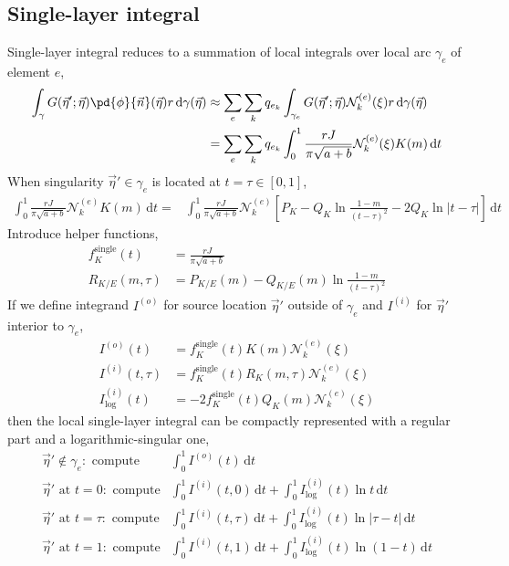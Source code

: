 \documentclass{jfm}
\begin{document}
\subsection{Single-layer integral}
Single-layer integral reduces to a summation of local integrals over local arc $\gamma_e$ of element $e$,
\begin{align}
\nonumber\int_{\gamma}G(\vec{\eta}';\vec{\eta})
\pd{\phi}{\vec{n}}(\vec{\eta}) r \,\mathrm{d}\gamma(\vec{\eta})
&\approx\sum_e \sum_k q_{e_k}
\int_{\gamma_e}G(\vec{\eta}';\vec{\eta})\mathcal{N}^{(e)}_k(\xi) r \,\mathrm{d}\gamma(\vec{\eta})\\
&=\sum_e \sum_k q_{e_k}
\int_0^1\frac{ r J }{\pi \sqrt{a+b}}\mathcal{N}^{(e)}_k(\xi)K(m)\,\mathrm{d}t
\end{align}
When singularity $\vec{\eta}'\in \gamma_e$ is located at $t=\tau \in[0,1]$,
\begin{align*}
\int_0^1\frac{ r J }{\pi \sqrt{a+b}}\mathcal{N}^{(e)}_kK(m)\,\mathrm{d}t
=&\int_0^1\frac{ r J }{\pi \sqrt{a+b}}\mathcal{N}^{(e)}_k
\left[P_K -Q_K\ln\frac{1-m}{(t-\tau)^2}-2 Q_K\ln |t-\tau| \right]\,\mathrm{d}t
\end{align*}
Introduce helper functions,
\begin{align}
f_K^\mathrm{single}(t)&= \frac{ r J }{\pi \sqrt{a+b}} \\
R_{K/E}(m,\tau)&= P_{K/E}(m) -Q_{K/E}(m) \ln\frac{1-m}{(t-\tau)^2}
\end{align}
If we define integrand $I^{(o)}$ for source location $\vec{\eta}'$ outside of $\gamma_e$
and $I^{(i)}$ for $\vec{\eta}'$ interior to $\gamma_e$,
\begin{align}
I^{(o)}(t) &=  f_K^\mathrm{single}(t) K(m)\mathcal{N}^{(e)}_k(\xi)\\
I^{(i)}(t,\tau) &= f_K^\mathrm{single}(t)R_K(m,\tau)\mathcal{N}^{(e)}_k(\xi)\\
I^{(i)}_\mathrm{log}(t) &=-2 f_K^\mathrm{single} (t)Q_K(m) \mathcal{N}^{(e)}_k(\xi)
\end{align}
then the local single-layer integral can be compactly represented
with a regular part and a logarithmic-singular one,
\begin{align}
\vec{\eta}' \not\in \gamma_e:\,\,\textrm{compute}&\int_0^1I^{(o)}(t)\,\mathrm{d}t\\
\vec{\eta}' \textrm{ at } t= 0:\,\,\textrm{compute}&\int_0^1I^{(i)}(t,0)\,\mathrm{d}t+
\int_0^1I^{(i)}_\mathrm{log}(t)\ln t\,\mathrm{d}t\\
\vec{\eta}' \textrm{ at } t= \tau:\,\,\textrm{compute}&\int_0^1I^{(i)}(t,\tau)\,\mathrm{d}t+
\int_0^1I^{(i)}_\mathrm{log}(t)\ln|\tau-t|\,\mathrm{d}t\\
\vec{\eta}' \textrm{ at } t= 1:\,\,\textrm{compute}&\int_0^1I^{(i)}(t,1)\,\mathrm{d}t+
\int_0^1I^{(i)}_\mathrm{log}(t)\ln(1-t)\,\mathrm{d}t
\end{align}
\end{document}

